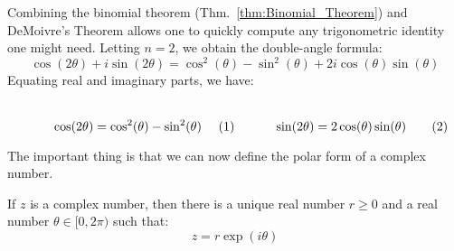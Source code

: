     Combining the binomial theorem (Thm.~\ref{thm:Binomial_Theorem})
    and DeMoivre's Theorem allows one to quickly compute any
    trigonometric identity one might need. Letting $n=2$, we obtain the
    double-angle formula:
    \begin{equation}
        \cos(2\theta)+i\sin(2\theta)=\cos^{2}(\theta)-\sin^{2}(\theta)
                                    +2i\cos(\theta)\sin(\theta)
    \end{equation}
    Equating real and imaginary parts, we have:
    \par
    \begin{subequations}
        \begin{minipage}[b]{0.49\textwidth}
            \centering
            \begin{equation}
                \cos(2\theta)=\cos^{2}(\theta)-\sin^{2}(\theta)
            \end{equation}
        \end{minipage}
        \hfill
        \begin{minipage}[b]{0.49\textwidth}
            \centering
            \begin{equation}
                \sin(2\theta)=2\cos(\theta)\sin(\theta)
            \end{equation}
        \end{minipage}
    \end{subequations}
    \par
    \vspace{2.5ex}
    The important thing is that we can now define the polar form of a
    complex number.
    \begin{theorem}
        \label{thm:Polar_Form_Comp_Num}%
        If $z$ is a complex number, then there is a unique real number
        $r\geq{0}$ and a real number $\theta\in[0,2\pi)$ such that:
        \begin{equation}
            \label{eqn:Polar_Form_Comp_Num}%
            z=r\exp(i\theta)
        \end{equation}
    \end{theorem}
